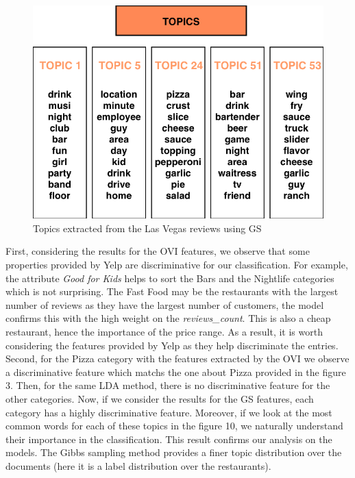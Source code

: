 \documentclass[twoside]{article}
\begin{document}
\begin{multicols}{2}
\begin{figure}[H]
\centering
\includegraphics[width=1\linewidth]{img/gs_topics.png}
\caption{Topics extracted from the Las Vegas reviews using GS}
\end{figure}

\noindent First, considering the results for the OVI features, we observe that some properties provided by Yelp are discriminative for our classification. For example, the attribute \textit{Good for Kids} helps to sort the Bars and the Nightlife categories which is not surprising. The Fast Food may be the restaurants with the largest number of reviews as they have the largest number of customers, the model confirms this with the high weight on the \textit{reviews\_count}. This is also a cheap restaurant, hence the importance of the price range. As a result, it is worth considering the features provided by Yelp as they help discriminate the entries.\\

\noindent Second, for the Pizza category with the features extracted by the OVI we observe a discriminative feature which matchs the one about Pizza provided in the figure 3. Then, for the same LDA method, there is no discriminative feature for the other categories. Now, if we consider the results for the GS features, each category has a highly discriminative feature. Moreover, if we look at the most common words for each of these topics in the figure 10, we naturally understand their importance in the classification. This result confirms our analysis on the models. The Gibbs sampling method provides a finer topic distribution over the documents (here it is a label distribution over the restaurants).


\end{multicols}
\end{document}
